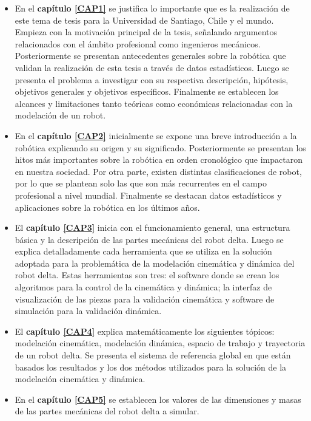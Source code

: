 \begin{itemize}
    \item {En el \textbf{capítulo \eqref{CAP1}} se justifica lo importante que es la realización de este tema de tesis para la Universidad de Santiago, Chile y el mundo. Empieza con la motivación principal de la tesis, señalando argumentos relacionados con el ámbito profesional como ingenieros mecánicos. Posteriormente se presentan antecedentes generales sobre la robótica que validan la realización de esta tesis a través de datos estadísticos. 
    Luego se presenta el problema a investigar con su respectiva descripción, hipótesis, objetivos generales y  objetivos específicos.
    Finalmente se establecen los alcances y limitaciones tanto teóricas como económicas relacionadas con la modelación de un robot.}
    \item {En el \textbf{capítulo \eqref{CAP2}} inicialmente se expone una breve introducción a la robótica explicando su origen y su significado. Posteriormente se presentan los hitos más importantes sobre la robótica en orden cronológico que impactaron en nuestra sociedad. Por otra parte, existen distintas clasificaciones de robot, por lo que se plantean solo las que son más recurrentes en el campo profesional a nivel mundial. Finalmente se destacan datos estadísticos y aplicaciones sobre la robótica en los últimos años.}
    \item {El \textbf{capítulo \eqref{CAP3}} inicia con el funcionamiento general, una estructura básica y la descripción de las partes mecánicas del robot delta. Luego se explica detalladamente cada herramienta que se utiliza en la solución adoptada para la problemática de la modelación cinemática y dinámica del robot delta. Estas herramientas son tres: el software donde se crean los algoritmos para la control de la cinemática y dinámica; la interfaz de visualización de las piezas para la validación cinemática y software de simulación para la validación dinámica.}
    \item {El \textbf{capítulo \eqref{CAP4}} explica matemáticamente los siguientes tópicos: modelación cinemática, modelación dinámica, espacio de trabajo y trayectoria de un robot delta. Se presenta el sistema de referencia global en que están basados los resultados y los dos métodos utilizados para la solución de la modelación cinemática y dinámica.}
    \item {En el \textbf{capítulo \eqref{CAP5}} se establecen los valores de las dimensiones y masas de las partes mecánicas del robot delta a simular.}

\end{itemize}

